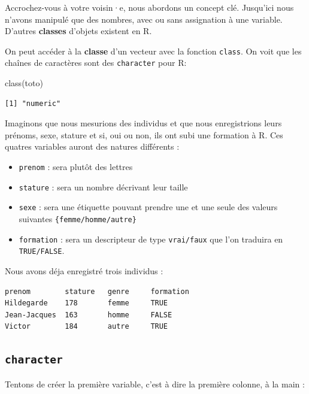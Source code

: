 \documentclass[
  letterpaper,
  DIV=11,
  numbers=noendperiod]{scrreprt}
\newenvironment{Shaded}{\begin{snugshade}}{\end{snugshade}}
\newcommand{\FunctionTok}[1]{\textcolor[rgb]{0.28,0.35,0.67}{#1}}
\newcommand{\NormalTok}[1]{\textcolor[rgb]{0.00,0.23,0.31}{#1}}
\providecommand{\tightlist}{%
  \setlength{\itemsep}{0pt}\setlength{\parskip}{0pt}}\usepackage{longtable,booktabs,array}
\begin{document}
Accrochez-vous à votre voisin·e, nous abordons un concept clé. Jusqu'ici
nous n'avons manipulé que des nombres, avec ou sans assignation à une
variable. D'autres \textbf{classes} d'objets existent en R.

On peut accéder à la \textbf{classe} d'un vecteur avec la fonction
\texttt{class}. On voit que les chaînes de caractères sont des
\texttt{character} pour R:

\begin{Shaded}
\begin{Highlighting}[]
\FunctionTok{class}\NormalTok{(toto)}
\end{Highlighting}
\end{Shaded}

\begin{verbatim}
[1] "numeric"
\end{verbatim}

Imaginons que nous mesurions des individus et que nous enregistrions
leurs prénoms, sexe, stature et si, oui ou non, ils ont subi une
formation à R. Ces quatres variables auront des natures différents :

\begin{itemize}
\tightlist
\item
  \texttt{prenom} : sera plutôt des lettres
\item
  \texttt{stature} : sera un nombre décrivant leur taille
\item
  \texttt{sexe} : sera une étiquette pouvant prendre une et une seule
  des valeurs suivantes \texttt{\{femme/homme/autre\}}
\item
  \texttt{formation} : sera un descripteur de type \texttt{vrai/faux}
  que l'on traduira en \texttt{TRUE/FALSE}.
\end{itemize}

Nous avons déja enregistré trois individus :

\begin{verbatim}
prenom        stature   genre     formation
Hildegarde    178       femme     TRUE
Jean-Jacques  163       homme     FALSE
Victor        184       autre     TRUE
\end{verbatim}

\hypertarget{character}{%
\subsection{\texorpdfstring{\texttt{character}}{character}}\label{character}}

Tentons de créer la première variable, c'est à dire la première colonne,
à la main :
\end{document}
